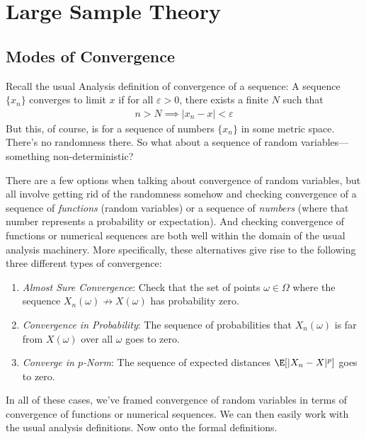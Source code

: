 \documentclass[12pt]{article}
\theoremstyle{plain}
\theoremstyle{definition}
\theoremstyle{remark}
\newcommand{\ra}{\rightarrow}
\begin{document}
\clearpage
\section{Large Sample Theory}


\subsection{Modes of Convergence}

Recall the usual Analysis definition of convergence of a sequence: A
sequence $\{x_n\}$ converges to limit $x$ if for all $\varepsilon> 0$,
there exists a finite $N$ such that
\begin{align*}
  n > N \implies |x_n - x| < \varepsilon
\end{align*}
But this, of course, is for a sequence of numbers $\{x_n\}$ in some
metric space. There's no randomness there. So what about a sequence of
random variables---something non-deterministic?

There are a few options when talking about convergence of random
variables, but all involve getting rid of the randomness somehow and
checking convergence of a sequence of \emph{functions} (random
variables) or a sequence of \emph{numbers} (where that number represents
a probability or expectation). And checking convergence of functions or
numerical sequences are both well within the domain of the usual
analysis machinery. More specifically, these alternatives give rise to
the following three different types of convergence:
\begin{enumerate}
  \item \emph{Almost Sure Convergence}: Check that the set of points
    $\omega\in\Omega$ where the sequence $X_n(\omega)\not\ra
    X(\omega)$ has probability zero.
  \item \emph{Convergence in Probability}: The sequence of probabilities
    that $X_n(\omega)$ is far from $X(\omega)$ over all $\omega$ goes to
    zero.
  \item \emph{Converge in $p$-Norm}: The sequence of expected distances
    $\E[|X_n-X|^p]$ goes to zero.
\end{enumerate}
In all of these cases, we've framed convergence of random variables in
terms of convergence of functions or numerical sequences. We can then
easily work with the usual analysis definitions. Now onto the formal
definitions.
\end{document}
